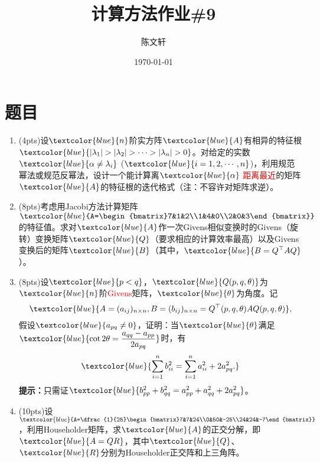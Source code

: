 \documentclass[cn,hazy,green,11pt,normal]{elegantnote}
\title{计算方法作业\#9}
\author{陈文轩}
\institute{KFRC}
\date{\today}
\begin{document}
\maketitle

\section{题目}


    \begin{enumerate}

        \item (4pts)设$\textcolor{blue}{n}$阶实方阵$\textcolor{blue}{A}$有相异的特征根$\textcolor{blue}{|\lambda_1|>|\lambda_2|>\cdots>|\lambda_n|>0}$。对给定的实数$\textcolor{blue}{\alpha\neq\lambda_i}$ ($\textcolor{blue}{i=1,2,\cdots,n}$)，利用规范幂法或规范反幂法，设计一个能计算离$\textcolor{blue}{\alpha}$ \textcolor{red}{距离最近}的矩阵$\textcolor{blue}{A}$的特征根的迭代格式（注：不容许对矩阵求逆）。

        \item (8pts)考虑用Jacobi方法计算矩阵$\textcolor{blue}{A=\begin{bmatrix}7&1&2\\1&4&0\\2&0&3\end{bmatrix}}$的特征值。求对$\textcolor{blue}{A}$作一次Givens相似变换时的Givens（旋转）变换矩阵$\textcolor{blue}{Q}$（要求相应的计算效率最高）以及Givens变换后的矩阵$\textcolor{blue}{B}$（其中，$\textcolor{blue}{B=Q^{\top} AQ}$）。

        \item (8pts)设$\textcolor{blue}{p<q}$，$\textcolor{blue}{Q(p,q,\theta)}$为$\textcolor{blue}{n}$阶\textcolor{red}{Givens}矩阵，$\textcolor{blue}{\theta}$为角度。记\[\textcolor{blue}{A=(a_{ij})_{n\times n},B=(b_{ij})_{n\times n}=Q^{\top}(p,q,\theta)AQ(p,q,\theta)},\]假设$\textcolor{blue}{a_{pq}\neq0}$，证明：当$\textcolor{blue}{\theta}$满足$\textcolor{blue}{\cot2\theta= \dfrac{a_{qq}-a_{pp}}{2a_{pq}}}$时，有\[\textcolor{blue}{\sum_{i=1}^{n}b_{ii}^2=\sum_{i=1}^{n}a_{ii}^2+2a_{pq}^2.}\]\textbf{提示：}只需证$\textcolor{blue}{b_{pp}^2+b_{qq}^2=a_{pp}^2+a_{qq}^2+2a_{pq}^2}$。

        \item (10pts)设$\textcolor{blue}{A=\dfrac{1}{25}\begin{bmatrix}7&7&24\\0&50&-25\\24&24&-7\end{bmatrix}}$，利用Householder矩阵，求$\textcolor{blue}{A}$的正交分解，即$\textcolor{blue}{A=QR}$，其中$\textcolor{blue}{Q}$、$\textcolor{blue}{R}$分别为Householder正交阵和上三角阵。

    \end{enumerate}
\end{document}
